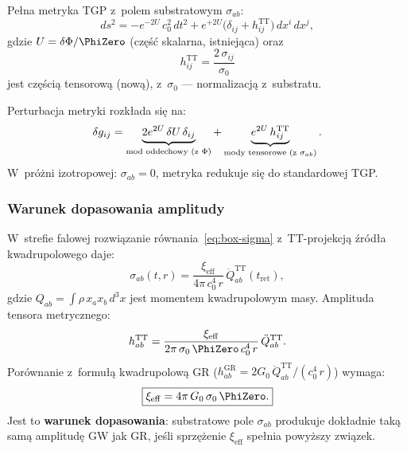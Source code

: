 \begin{proposition}%
\label{prop:metric-with-tensor}
Pe\l{}na metryka TGP z~polem substratowym $\sigma_{ab}$:
\begin{equation}\label{eq:metric-full-tensor}
  \boxed{
    ds^2 = -e^{-2U}\,c_0^2\,dt^2
    + e^{+2U}\bigl(\delta_{ij} + h_{ij}^{\mathrm{TT}}\bigr)
    \,dx^i\,dx^j,
  }
\end{equation}
gdzie $U = \delta\Phi/\PhiZero$ (cz\k{e}\'s\'c skalarna, istniej\k{a}ca)
oraz
\begin{equation}\label{eq:h-TT-from-sigma}
  h_{ij}^{\mathrm{TT}} = \frac{2\,\sigma_{ij}}{\sigma_0}
\end{equation}
jest cz\k{e}\'sci\k{a} tensorow\k{a} (now\k{a}),
z~$\sigma_0$ --- normalizacj\k{a} z~substratu.

Perturbacja metryki rozk\l{}ada si\k{e} na:
\begin{equation}
  \delta g_{ij} = \underbrace{2e^{2U}\,\delta U\,\delta_{ij}}_%
  {\text{mod oddechowy (z~$\Phi$)}}
  + \underbrace{e^{2U}\,h_{ij}^{\mathrm{TT}}}_%
  {\text{mody tensorowe (z~$\sigma_{ab}$)}}.
\end{equation}
W~pr\'o\.zni izotropowej: $\sigma_{ab} = 0$,
metryka redukuje si\k{e} do standardowej TGP.
\end{proposition}

\subsubsection{Warunek dopasowania amplitudy}

\begin{theorem}[Dopasowanie do GR]\label{thm:amplitude-matching}
W~strefie falowej rozwi\k{a}zanie r\'ownania~\eqref{eq:box-sigma}
z~TT-projekcj\k{a} \'zr\'od\l{}a kwadrupolowego daje:
\begin{equation}\label{eq:sigma-far-field}
  \sigma_{ab}(t, r) = \frac{\xi_{\mathrm{eff}}}{4\pi\,c_0^4\,r}\,
  \ddot{Q}_{ab}^{\mathrm{TT}}(t_{\mathrm{ret}}),
\end{equation}
gdzie $Q_{ab} = \int\!\rho\,x_a x_b\,d^3x$ jest momentem kwadrupolowym masy.
Amplituda tensora metrycznego:
\begin{equation}
  h_{ab}^{\mathrm{TT}}
  = \frac{\xi_{\mathrm{eff}}}{2\pi\,\sigma_0\,\PhiZero\,c_0^4\,r}\,
  \ddot{Q}_{ab}^{\mathrm{TT}}.
\end{equation}
Por\'ownanie z~formu\l{}\k{a} kwadrupolow\k{a} GR
($h_{ab}^{\mathrm{GR}} = 2G_0\,\ddot{Q}_{ab}^{\mathrm{TT}}/(c_0^4\,r)$)
wymaga:
\begin{equation}\label{eq:xi-matching}
  \boxed{
    \xi_{\mathrm{eff}}
    = 4\pi\,G_0\,\sigma_0\,\PhiZero.
  }
\end{equation}
Jest to \textbf{warunek dopasowania}: substratowe pole $\sigma_{ab}$
produkuje dok\l{}adnie tak\k{a} sam\k{a} amplitud\k{e} GW
jak GR, je\'sli sprz\k{e}\.zenie $\xi_{\mathrm{eff}}$
spe\l{}nia powy\.zszy zwi\k{a}zek.
\end{theorem}

